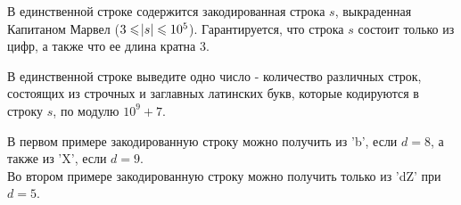 \begin{problem}
В единственной строке содержится закодированная строка $s$, выкраденная Капитаном Марвел ($3 \leqslant \abs{s} \leqslant 10^5$). Гарантируется, что строка $s$ состоит только из цифр, а также что ее длина кратна 3.

\OutputFile

В единственной строке выведите одно число - количество различных строк, состоящих из строчных и заглавных латинских букв, которые кодируются в строку $s$, по модулю $10^9 + 7$.

\Examples

\begin{example}
%
%
%
\end{example}

\Note

В первом примере закодированную строку можно получить из 'b', если $d = 8$, а также из 'X', если $d = 9$.\\

Во втором примере закодированную строку можно получить только из 'dZ' при $d = 5$.

\end{problem}
